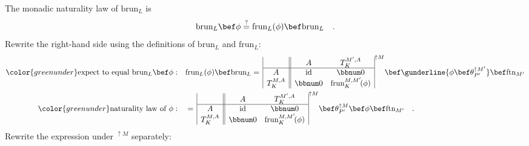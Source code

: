 The monadic naturality law of $\text{brun}_{L}$ is
\[
\text{brun}_{L}\bef\phi\overset{?}{=}\text{frun}_{L}(\phi)\bef\text{brun}_{L}\quad.
\]
Rewrite the right-hand side using the definitions of $\text{brun}_{L}$
and $\text{frun}_{L}$:
\begin{align*}
{\color{greenunder}\text{expect to equal }\text{brun}_{L}\bef\phi:}\quad & \text{frun}_{L}(\phi)\bef\text{brun}_{L}=\,\begin{array}{|c||cc|}
 & A & T_{K}^{M^{\prime},A}\\
\hline A & \text{id} & \bbnum 0\\
T_{K}^{M,A} & \bbnum 0 & \text{frun}_{K}^{M,M^{\prime}}\!(\phi)
\end{array}^{\uparrow M}\bef\gunderline{\phi\bef\theta_{P^{\prime}}^{\uparrow M^{\prime}}}\bef\text{ftn}_{M^{\prime}}\\
{\color{greenunder}\text{naturality law of }\phi:}\quad & =\,\begin{array}{|c||cc|}
 & A & T_{K}^{M^{\prime},A}\\
\hline A & \text{id} & \bbnum 0\\
T_{K}^{M,A} & \bbnum 0 & \text{frun}_{K}^{M,M^{\prime}}\!(\phi)
\end{array}^{\uparrow M}\bef\theta_{P^{\prime}}^{\uparrow M}\bef\phi\bef\text{ftn}_{M^{\prime}}\quad.
\end{align*}
Rewrite the expression under $^{\uparrow M}$ separately:
